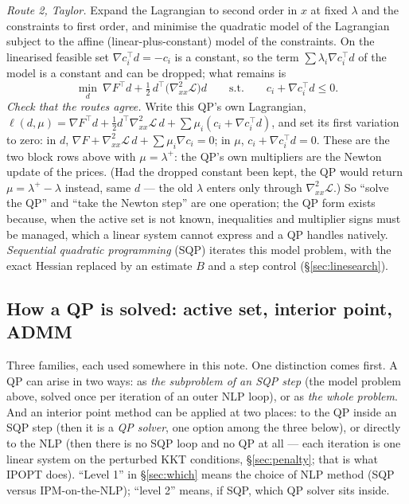 \documentclass[11pt,a4paper]{article}
\newcommand{\T}{^{\!\top}}
\newcommand{\rev}[1]{#1}
\newcommand{\revb}[1]{#1}
\begin{document}
\emph{Route 2, Taylor.}  Expand the Lagrangian to second order in $x$ at fixed
$\lambda$ and the constraints to first order, and minimise the quadratic model of the
Lagrangian subject to the \rev{affine (linear-plus-constant)} model of the constraints.  On the linearised feasible
set $\nabla c_i\T d=-c_i$ is a constant, so the term $\sum\lambda_i\nabla c_i\T d$ of the
model is a constant and can be dropped; what remains is
\[
\boxed{\;
\min_d\ \nabla F\T d+\tfrac12\,d\T\bigl(\nabla^2_{xx}\mathcal L\bigr)d
\qquad\text{s.t.}\qquad c_i+\nabla c_i\T d\le0 .
\;}
\]
\emph{Check that the routes agree.}  Write this QP's own Lagrangian,
$\ell(d,\mu)=\nabla F\T d+\tfrac12d\T\nabla^2_{xx}\mathcal L\,d+\sum\mu_i(c_i+\nabla c_i\T d)$,
and set its first variation to zero: in $d$,
$\nabla F+\nabla^2_{xx}\mathcal L\,d+\sum\mu_i\nabla c_i=0$; in $\mu$,
$c_i+\nabla c_i\T d=0$.  These are the two block rows above with $\mu=\lambda^{+}$: the
QP's own multipliers are the Newton update of the prices.  (Had the dropped constant been
kept, the QP would return $\mu=\lambda^{+}-\lambda$ instead, same $d$ --- the old
$\lambda$ enters only through $\nabla^2_{xx}\mathcal L$.)  So ``solve the QP'' and
``take the Newton step'' are one operation; the QP form exists because, when the active
set is not known, inequalities and multiplier signs must be managed, which a linear
system cannot express and a QP handles natively.  \emph{Sequential quadratic
programming} (SQP) iterates this model problem, with the exact Hessian replaced by an
estimate $B$ and a step control (\S\ref{sec:linesearch}).

\subsection{How a QP is solved: active set, interior point, ADMM}
\label{sec:qpsolve}
\rev{Three families, each used somewhere in this note.  \revb{One distinction comes first.}  A QP can
arise in two ways: as \emph{the subproblem of an SQP step} (the model problem above,
solved once per iteration of an outer NLP loop), or as \emph{the whole problem}.  And an
interior point method can be applied at two places: to the QP inside an SQP step (then it
is a \emph{QP solver}, one option among the three below), or directly to the NLP (then
there is no SQP loop and no QP at all --- each iteration is one linear system on the
perturbed KKT conditions, \S\ref{sec:penalty}; that is what IPOPT does).  ``Level 1''
in \S\ref{sec:which} means the choice of NLP method (SQP versus IPM-on-the-NLP);
``level 2'' means, if SQP, which QP solver sits inside.}
\end{document}
